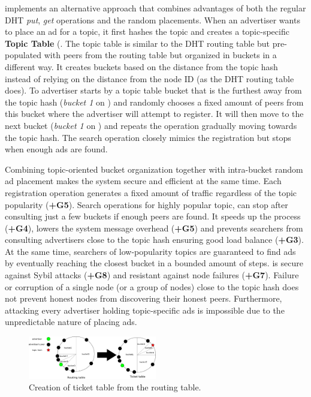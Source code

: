 \sysname implements an alternative approach that combines advantages of both the regular DHT \emph{put}, \emph{get} operations and the random placements. When an advertiser wants to place an ad for a topic, it first hashes the topic and creates a topic-specific \textbf{Topic Table} (. The topic table is similar to the DHT routing table but pre-populated with peers from the routing table but organized in buckets in a different way. It creates buckets based on the distance from the topic hash instead of relying on the distance from the node ID (as the DHT routing table does). To advertiser starts by a topic table bucket that is the furthest away from the topic hash (\ie \emph{bucket 1} on ) and randomly chooses a fixed amount of peers from this bucket where the advertiser will attempt to register. It will then move to the next bucket (\ie \emph{bucket 1} on ) and repeats the operation gradually moving towards the topic hash. The search operation closely mimics the registration but stops when enough ads are found. 

Combining topic-oriented bucket organization together with intra-bucket random ad placement makes the system secure and efficient at the same time. Each registration operation generates a fixed amount of traffic regardless of the topic popularity (\textbf{+G5}). Search operations for highly popular topic, can stop after consulting just a few buckets if enough peers are found. It speeds up the process (\textbf{+G4}), lowers the system message overhead (\textbf{+G5}) and prevents searchers from consulting advertisers close to the topic hash ensuring good load balance (\textbf{+G3}). At the same time, searchers of low-popularity topics are guaranteed to find ads by eventually reaching the closest bucket in a bounded amount of steps. \sysname is secure against Sybil attacks (\textbf{+G8}) and resistant against node failures (\textbf{+G7}). Failure or corruption of a single node (or a group of nodes) close to the topic hash does not prevent honest nodes from discovering their honest peers. Furthermore, attacking every advertiser holding topic-specific ads is impossible due to the unpredictable nature of placing ads. 


\begin{figure}
    \includegraphics[width=0.5\textwidth]{img/ticket_table}
    \caption{Creation of ticket table from the routing table.}
    \label{fig:ticket_table}
 \end{figure}
 
